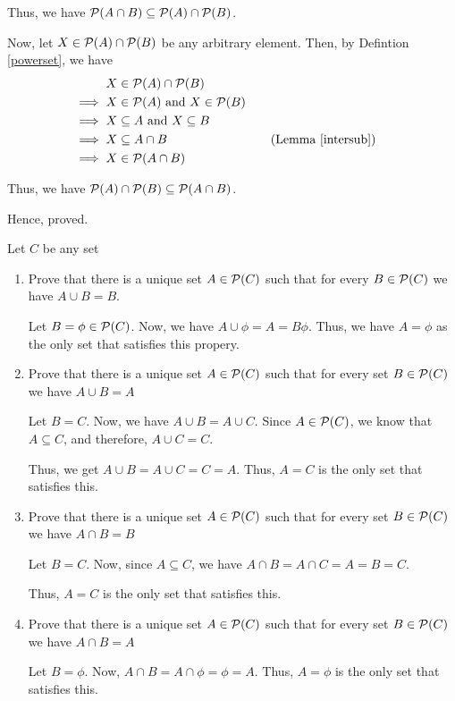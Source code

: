 	Thus, we have $\mathcal{P}(A \cap B) \subseteq \mathcal{P}(A) \cap \mathcal{P}(B)$.

	Now, let $X \in \mathcal{P}(A) \cap \mathcal{P}(B)$ be any arbitrary element. Then, by Defintion \ref{powerset}, we  have
	\begin{align*}
		X &\in \mathcal{P}(A) \cap \mathcal{P}(B) \\
		\implies X &\in \mathcal{P}(A) \text{ and } X \in \mathcal{P}(B) \\
		\implies X &\subseteq A \text{ and } X \subseteq B \\
		\implies X &\subseteq A \cap B && \quad \text{(Lemma \ref{intersub})} \\
		\implies X &\in \mathcal{P}(A \cap B)
	\end{align*}
	
	Thus, we have $\mathcal{P}(A) \cap \mathcal{P}(B) \subseteq \mathcal{P}(A \cap B)$.

	Hence, proved.
\es

\bp
Let $C$ be any set
\begin{enumerate}
	\item Prove that there is a unique set $A \in \mathcal{P}(C)$ such that for every $B \in \mathcal{P}(C)$ we have $A \cup B = B$.

		\bs
		Let $B = \phi \in \mathcal{P}(C)$. Now, we have $A \cup \phi = A = B \phi$. Thus, we have $A = \phi$ as the only set that satisfies this propery.
		\es

	\item Prove that there is a unique set $A \in \mathcal{P}(C)$ such that for every set $B \in \mathcal{P}(C)$ we have $A \cup B = A$

		\bs
		Let $B = C$. Now, we have $A \cup B = A \cup C$.
		Since $A \in \mathcal{P}(C)$, we know that $A \subseteq C$, and therefore, $A \cup C = C$.

		Thus, we get $A \cup B = A \cup C = C = A$. Thus, $A = C$ is the only set that satisfies this.
		\es

	\item Prove that there is a unique set $A \in \mathcal{P}(C)$ such that for every set $B \in \mathcal{P}(C)$ we have $A \cap B = B$

		\bs
		Let $B = C$. Now, since $A \subseteq C$, we have $A \cap B = A \cap C = A = B = C$.

		Thus, $A = C$ is the only set that satisfies this.
		\es

	\item Prove that there is a unique set $A \in \mathcal{P}(C)$ such that for every set $B \in \mathcal{P}(C)$ we have $A \cap B = A$

		\bs
		Let $B = \phi$. Now, $A \cap B = A \cap \phi = \phi = A$. 
		Thus, $A = \phi$ is the only set that satisfies this.
		\es
\end{enumerate}
\ep

